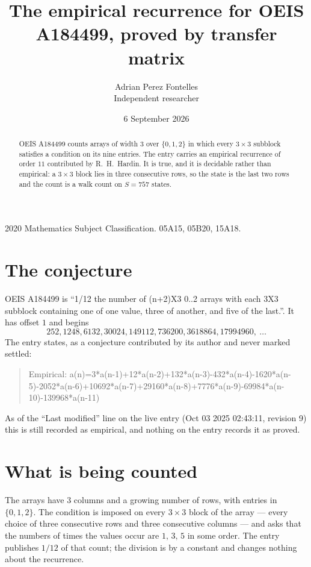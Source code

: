 \documentclass[11pt,a4paper]{article}
\title{The empirical recurrence for OEIS A184499, proved by transfer matrix}
\author{Adrian Perez Fontelles\\ \small Independent researcher}
\date{6 September 2026}
\theoremstyle{plain}
\theoremstyle{definition}
\begin{document}
\maketitle

\begin{abstract}
OEIS A184499 counts arrays of width $3$ over $\{0,1,2\}$ in which every $3\times3$ subblock
satisfies a condition on its nine entries. The entry carries an empirical recurrence of order
$11$ contributed by R.~H.~Hardin. It is true, and it is decidable rather than empirical: a
$3\times3$ block lies in three consecutive rows, so the state is the last two rows and the
count is a walk count on $S=757$ states.
\end{abstract}

\noindent\small 2020 Mathematics Subject Classification. 05A15, 05B20, 15A18.\normalsize

\section{The conjecture}

OEIS A184499 is ``1/12 the number of (n+2)X3 0..2 arrays with each 3X3 subblock containing one of one value, three of another, and five of the last.''. It has offset $1$ and begins
\[
252, 1248, 6132, 30024, 149112, 736200, 3618864, 17994960,\ \dots
\]
The entry states, as a conjecture contributed by its author and never marked settled:
\begin{quote}
Empirical: a(n)=3*a(n-1)+12*a(n-2)+132*a(n-3)-432*a(n-4)-1620*a(n-5)-2052*a(n-6)+10692*a(n-7)+29160*a(n-8)+7776*a(n-9)-69984*a(n-10)-139968*a(n-11)
\end{quote}
As of the ``Last modified'' line on the live entry (Oct 03 2025 02:43:11, revision 9) this is still
recorded as empirical, and nothing on the entry records it as proved.

\section{What is being counted}

The arrays have $3$ columns and a growing number of rows, with entries in $\{0,1,2\}$. The
condition is imposed on every $3\times3$ block of the array --- every choice of three
consecutive rows and three consecutive columns --- and asks that the numbers of times the values occur are $1,\,3,\,5$ in some order. The entry publishes $1/12$ of that count; the division is by a constant and changes nothing about the recurrence.
\end{document}
